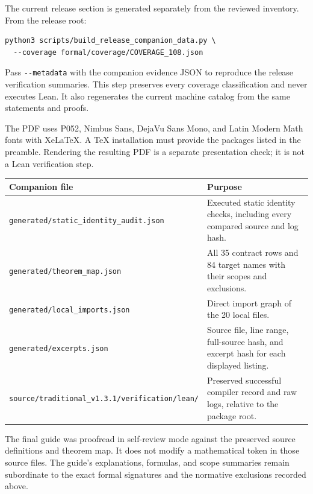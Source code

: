 \documentclass[11pt,a4paper]{article}
\newcommand{\code}[1]{\nolinkurl{#1}}
\begin{document}
The current release section is generated separately from the reviewed inventory. From the release root:
\begin{lstlisting}
python3 scripts/build_release_companion_data.py \
  --coverage formal/coverage/COVERAGE_108.json
\end{lstlisting}
Pass \code{--metadata} with the companion evidence JSON to reproduce the release verification summaries. This step preserves every coverage classification and never executes Lean. It also regenerates the current machine catalog from the same statements and proofs.

The PDF uses P052, Nimbus Sans, DejaVu Sans Mono, and Latin Modern Math fonts with XeLaTeX. A TeX installation must provide the packages listed in the preamble. Rendering the resulting PDF is a separate presentation check; it is not a Lean verification step.

\begin{longtable}{p{}p{}}
\toprule Companion file & Purpose \\\midrule\endhead
\code{generated/static_identity_audit.json} & Executed static identity checks, including every compared source and log hash. \\
\code{generated/theorem_map.json} & All 35 contract rows and 84 target names with their scopes and exclusions. \\
\code{generated/local_imports.json} & Direct import graph of the 20 local files. \\
\code{generated/excerpts.json} & Source file, line range, full-source hash, and excerpt hash for each displayed listing. \\
\code{source/traditional_v1.3.1/verification/lean/} & Preserved successful compiler record and raw logs, relative to the package root. \\
\bottomrule
\end{longtable}

The final guide was proofread in self-review mode against the preserved source definitions and theorem map. It does not modify a mathematical token in those source files. The guide's explanations, formulas, and scope summaries remain subordinate to the exact formal signatures and the normative exclusions recorded above.
\end{document}
